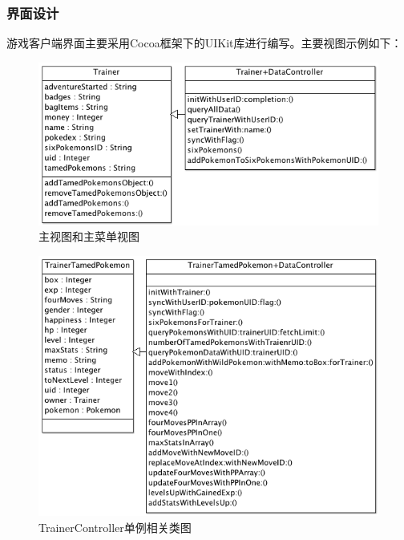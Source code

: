 \documentclass{article}
\begin{document}
\begin{CJK}{UTF8}{gbsn}
	\subsubsection{界面设计}
  游戏客户端界面主要采用Cocoa框架下的UIKit库进行编写。主要视图示例如下：

  \begin{figure}[htbp]
		\centering
		\includegraphics[bb=0 0 548 341, scale=0.45]{figure/fig_n12.png}
		\caption{主视图和主菜单视图}
		\label{fig:n12}
	\end{figure}

  \begin{figure}[htbp]
		\centering
		\includegraphics[bb=0 0 548 341, scale=0.45]{figure/fig_n13.png}
		\caption{TrainerController单例相关类图}
		\label{fig:n13}
	\end{figure}


\end{CJK}
\end{document}
